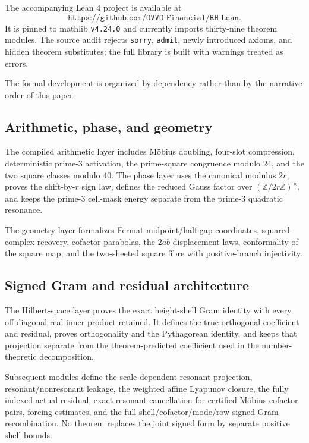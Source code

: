 \documentclass[11pt]{article}
\theoremstyle{definition}
\theoremstyle{remark}
\newcommand{\1}{\mathbf{1}}
\begin{document}
The accompanying Lean 4 project is available at
\[
 \texttt{https://github.com/OVVO-Financial/RH\_Lean}.
\]
It is pinned to mathlib \texttt{v4.24.0} and currently imports thirty-nine theorem modules.  The source audit rejects \texttt{sorry}, \texttt{admit}, newly introduced axioms, and hidden theorem substitutes; the full library is built with warnings treated as errors.

The formal development is organized by dependency rather than by the narrative order of this paper.

\subsection{Arithmetic, phase, and geometry}

The compiled arithmetic layer includes M\"obius doubling, four-slot compression, deterministic prime-$3$ activation, the prime-square congruence modulo $24$, and the two square classes modulo $40$.  The phase layer uses the canonical modulus $2r$, proves the shift-by-$r$ sign law, defines the reduced Gauss factor over $(\mathbb Z/2r\mathbb Z)^\times$, and keeps the prime-$3$ cell-mask energy separate from the prime-$3$ quadratic resonance.

The geometry layer formalizes Fermat midpoint/half-gap coordinates, squared-complex recovery, cofactor parabolas, the $2ab$ displacement laws, conformality of the square map, and the two-sheeted square fibre with positive-branch injectivity.

\subsection{Signed Gram and residual architecture}

The Hilbert-space layer proves the exact height-shell Gram identity with every off-diagonal real inner product retained.  It defines the true orthogonal coefficient and residual, proves orthogonality and the Pythagorean identity, and keeps that projection separate from the theorem-predicted coefficient used in the number-theoretic decomposition.

Subsequent modules define the scale-dependent resonant projection, resonant/nonresonant leakage, the weighted affine Lyapunov closure, the fully indexed actual residual, exact resonant cancellation for certified M\"obius cofactor pairs, forcing estimates, and the full shell/cofactor/mode/row signed Gram recombination.  No theorem replaces the joint signed form by separate positive shell bounds.
\end{document}
